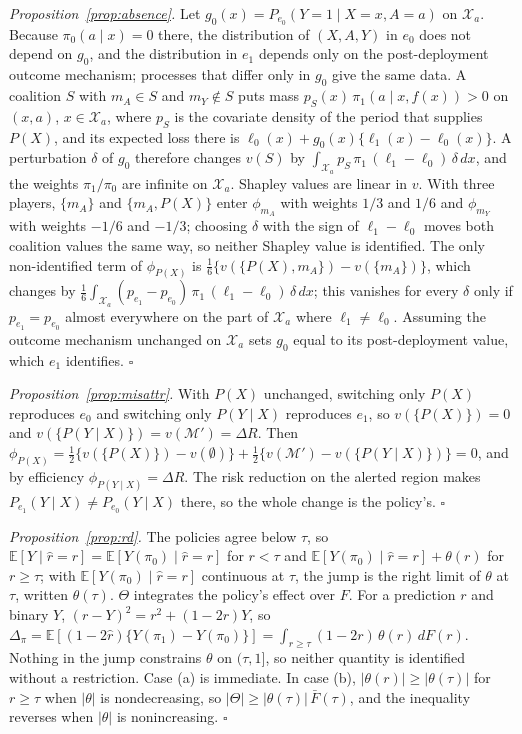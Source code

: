 \documentclass[letterpaper]{article} %
\newcommand{\E}{\mathbb{E}}
\newcommand{\rhat}{\hat r}
\begin{document}
\emph{Proposition~\ref{prop:absence}.} Let
$g_0(x) = P_{e_0}(Y{=}1 \mid X = x, A = a)$ on $\mathcal{X}_a$. Because
$\pi_0(a \mid x) = 0$ there, the distribution of $(X, A, Y)$ in $e_0$ does not
depend on $g_0$, and the distribution in $e_1$ depends only on the
post-deployment outcome mechanism; processes that differ only in $g_0$ give the
same data. A coalition $S$ with $m_A \in S$ and $m_Y \notin S$ puts mass
$p_S(x)\, \pi_1(a \mid x, f(x)) > 0$ on $(x, a)$, $x \in \mathcal{X}_a$, where
$p_S$ is the covariate density of the period that supplies $P(X)$, and its
expected loss there is $\ell_0(x) + g_0(x)\{\ell_1(x) - \ell_0(x)\}$. A
perturbation $\delta$ of $g_0$ therefore changes $v(S)$ by
$\int_{\mathcal{X}_a} p_S\, \pi_1\, (\ell_1 - \ell_0)\, \delta\, dx$, and the
weights $\pi_1/\pi_0$ are infinite on $\mathcal{X}_a$. Shapley values are linear
in $v$. With three players, $\{m_A\}$ and $\{m_A, P(X)\}$ enter $\phi_{m_A}$
with weights $1/3$ and $1/6$ and $\phi_{m_Y}$ with weights $-1/6$ and $-1/3$;
choosing $\delta$ with the sign of $\ell_1 - \ell_0$ moves both coalition values
the same way, so neither Shapley value is identified. The only non-identified
term of $\phi_{P(X)}$ is $\frac{1}{6}\{v(\{P(X), m_A\}) - v(\{m_A\})\}$, which
changes by
$\frac{1}{6} \int_{\mathcal{X}_a} (p_{e_1} - p_{e_0})\, \pi_1\,
(\ell_1 - \ell_0)\, \delta\, dx$; this vanishes for every $\delta$ only if
$p_{e_1} = p_{e_0}$ almost everywhere on the part of $\mathcal{X}_a$ where
$\ell_1 \neq \ell_0$. Assuming the outcome mechanism unchanged on
$\mathcal{X}_a$ sets $g_0$ equal to its post-deployment value, which $e_1$
identifies. $\square$

\emph{Proposition~\ref{prop:misattr}.} With $P(X)$ unchanged, switching only
$P(X)$ reproduces $e_0$ and switching only $P(Y \mid X)$ reproduces $e_1$, so
$v(\{P(X)\}) = 0$ and $v(\{P(Y \mid X)\}) = v(\mathcal{M}') = \Delta R$. Then
$\phi_{P(X)} = \frac12\{v(\{P(X)\}) - v(\emptyset)\} +
\frac12\{v(\mathcal{M}') - v(\{P(Y \mid X)\})\} = 0$, and by efficiency
$\phi_{P(Y \mid X)} = \Delta R$. The risk reduction on the alerted region makes
$P_{e_1}(Y \mid X) \neq P_{e_0}(Y \mid X)$ there, so the whole change is the
policy's. $\square$

\emph{Proposition~\ref{prop:rd}.} The policies agree below $\tau$, so
$\E[Y \mid \rhat = r] = \E[Y(\pi_0) \mid \rhat = r]$ for $r < \tau$ and
$\E[Y(\pi_0) \mid \rhat = r] + \theta(r)$ for $r \geq \tau$; with
$\E[Y(\pi_0) \mid \rhat = r]$ continuous at $\tau$, the jump is the right limit
of $\theta$ at $\tau$, written $\theta(\tau)$. $\Theta$ integrates the policy's
effect over $F$. For a prediction $r$ and binary $Y$,
$(r - Y)^2 = r^2 + (1 - 2r) Y$, so
$\Delta_\pi = \E[(1 - 2\rhat)\{Y(\pi_1) - Y(\pi_0)\}] =
\int_{r \geq \tau} (1 - 2r)\, \theta(r)\, dF(r)$. Nothing in the jump constrains
$\theta$ on $(\tau, 1]$, so neither quantity is identified without a
restriction. Case (a) is immediate. In case (b), $|\theta(r)| \geq
|\theta(\tau)|$ for $r \geq \tau$ when $|\theta|$ is nondecreasing, so
$|\Theta| \geq |\theta(\tau)|\, \bar F(\tau)$, and the inequality reverses when
$|\theta|$ is nonincreasing. $\square$
\end{document}
